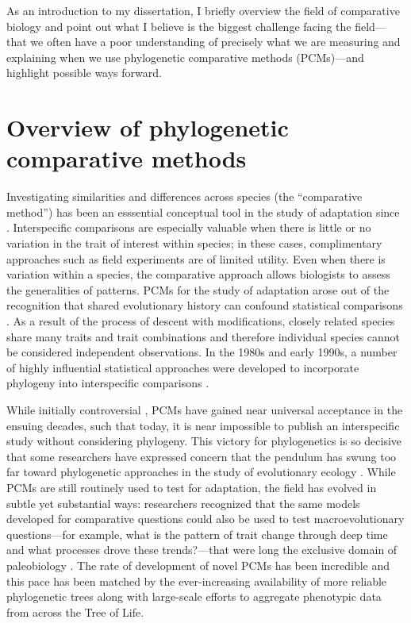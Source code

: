 As an introduction to my dissertation, I briefly overview the field of comparative biology \citep[for a more comprehensive discussion, see][]{PennellHarmon} and point out what I believe is the biggest challenge facing the field---that we often have a poor understanding of precisely what we are measuring and explaining when we use phylogenetic comparative methods (PCMs)---and highlight possible ways forward. 

\section{Overview of phylogenetic comparative methods}

Investigating similarities and differences across species (the ``comparative method'') has been an esssential conceptual tool in the study of adaptation since \citet{Darwin1859}. Interspecific comparisons are especially valuable when there is little or no variation in the trait of interest within species; in these cases, complimentary approaches such as field experiments are of limited utility. Even when there is variation within a species, the comparative approach allows biologists to assess the generalities of patterns. PCMs for the study of adaptation arose out of the recognition that shared evolutionary history can confound statistical comparisons \citep{HarveyPagel1991}. As a result of the process of descent with modifications, closely related species share many traits and trait combinations and therefore individual species cannot be considered independent observations. In the 1980s and early 1990s, a number of highly influential statistical approaches were developed to incorporate phylogeny into interspecific comparisons \citep{Ridley1983, Felsenstein1985, Grafen1989, Maddison1990, HarveyPagel1991, Lynch1991, Pagel1994}. 

While initially controversial \citep[e.g.,][]{Westoby1995}, PCMs have gained near universal acceptance in the ensuing decades, such that today, it is near impossible to publish an interspecific study without considering phylogeny. This victory for phylogenetics is so decisive that some researchers have expressed concern that the pendulum has swung too far toward phylogenetic approaches in the study of evolutionary ecology \citep{Losos2011}. While PCMs are still routinely used to test for adaptation, the field has evolved in subtle yet substantial ways: researchers recognized that the same models developed for comparative questions could also be used to test macroevolutionary questions---for example, what is the pattern of trait change through deep time and what processes drove these trends?---that were long the exclusive domain of paleobiology \citep{HansenMartins1996, Hansen1997, Schluter1997, Pagel1997, MooersSchluter1998, Pagel1999, Mooers1999}. The rate of development of novel PCMs has been incredible and this pace has been matched by the ever-increasing availability of more reliable phylogenetic trees along with large-scale efforts to aggregate phenotypic data from across the Tree of Life.

